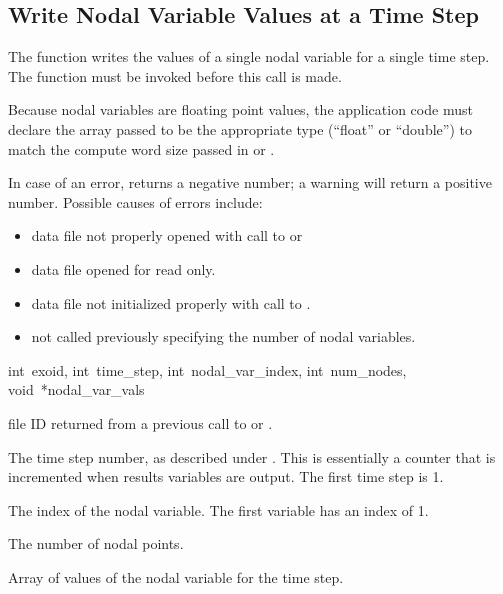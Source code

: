\subsection{Write Nodal Variable Values at a Time Step}

The function  writes the values of a single
nodal variable for a single time step. The function
 must be invoked before this call is made.

Because nodal variables are floating point values, the application
code must declare the array passed to be the appropriate type
(``float'' or ``double'') to match the compute word size passed in
 or .

In case of an error,  returns a negative
number; a warning will return a positive number. Possible causes of
errors include:

\begin{itemize}
 \item data file not properly opened with call to 
 or 

 \item data file opened for read only.

 \item data file not initialized properly with call to
 .

 \item {} not called previously specifying
 the number of nodal variables.
\end{itemize}

{int~exoid, 
int~time_step, 
int~nodal_var_index,
int~num_nodes, 
void~*nodal_var_vals}

\begin{parameters}
\item[{int exoid \R{}}]
\exo{} file ID returned from a previous call to  or
.

\item[{int time_step \R{}}]
The time step number, as described under . This
is essentially a counter that is incremented when results variables
are output. The first time step is 1.

\item[{int nodal_var_index \R{}}]
The index of the nodal variable. The first variable has an index of 1.

\item[{int num_nodes \R{}}]
 The number of nodal points.

\item[{void* nodal_var_vals \R{}}]
Array of  values of the \th{} nodal
variable for the \th{} time step.
\end{parameters}

